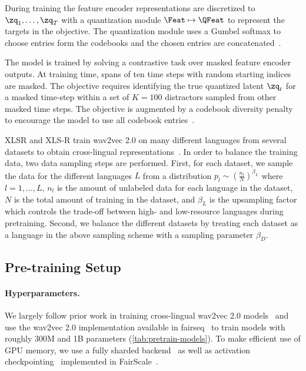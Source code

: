 During training the feature encoder representations are discretized to $\zq_1, \dots, \zq_T$ with a quantization module $\Feat \mapsto \QFeat$ to represent the targets in the objective.
The quantization module uses a Gumbel softmax to choose entries form the codebooks and the chosen entries are concatenated~\citep{jegou2011ieee,jang2016gumbel,baevski2019vqwav2vec}.

The model is trained by solving a contrastive task over masked feature encoder outputs.
At training time, spans of ten time steps with random starting indices are masked.
The objective requires identifying the true quantized latent $\zq_t$ for a masked time-step within a set of $K=100$ distractors sampled from other masked time steps.
The objective is augmented by a codebook diversity penalty to encourage the model to use all codebook entries~\citep{dieleman2018challenge}.

XLSR and XLS-R train wav2vec 2.0 on many different languages from several datasets to obtain cross-lingual representations~\citep{conneau2020unsupervised,babu22_interspeech}.
In order to balance the training data, two data sampling steps are performed.
First, for each dataset, we sample the data for the different languages $L$ from a distribution $p_l\sim\left(\frac{n_l}{N}\right)^{\beta_L}$ where $l=1,\ldots,L$, $n_l$ is the amount of unlabeled data for each language in the dataset, $N$ is the total amount of training in the dataset, and $\beta_L$ is the upsampling factor which controls the trade-off between high- and low-resource languages during pretraining.
Second, we balance the different datasets by treating each dataset as a language in the above sampling scheme with a sampling parameter $\beta_D$.


\insertPretrainSetup

\subsection{Pre-training Setup}
\label{sec:pretrain-setup}

\paragraph{Hyperparameters.}
We largely follow prior work in training cross-lingual wav2vec 2.0 models~\citep{conneau2020unsupervised,babu22_interspeech} and use the wav2vec 2.0 implementation available in fairseq~\citep{ott2019fairseq} to train models with roughly 300M and 1B parameters (\autoref{tab:pretrain-models}).
To make efficient use of GPU memory, we use a fully sharded backend~\citep{rajbhandari2021zero} as well as activation checkpointing~\citep{chen20216checkpointing} implemented in FairScale~\citep{FairScale2021}. 

